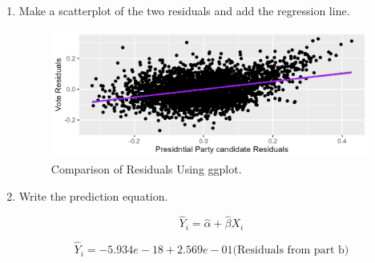 \documentclass[12pt,letterpaper]{article}
\begin{document}
\begin{enumerate}
		\item Make a scatterplot of the two residuals and add the regression line.
		
	  
			
	\begin{figure}[h!]
	\centering
	\caption{\footnotesize Comparison of Residuals Using ggplot.}
	\includegraphics[width=0.99\textwidth]{residuals_scatter.png}
	
\end{figure} 
		 
		\item Write the prediction equation.
		
		{\large 			$$\hat{Y}_i = \hat{\alpha} +  \hat{\beta}X_i $$}
		
		
		{ 			$$\hat{Y}_i =  -5.934e-18 +  2.569e-01  \text{(Residuals from part b)} $$} \\
		
	\end{enumerate}
	
	\newpage	
\end{document}
